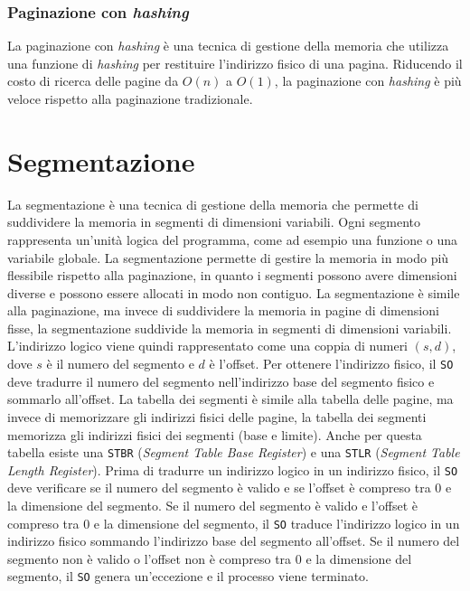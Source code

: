         \subsubsection{Paginazione con \textit{hashing}}
            La paginazione con \textit{hashing} è una tecnica di gestione della memoria che utilizza una funzione di \textit{hashing} per restituire l'indirizzo fisico di una pagina. Riducendo il costo di ricerca delle pagine da $O(n)$ a $O(1)$, la paginazione con \textit{hashing} è più veloce rispetto alla paginazione tradizionale. 
\section{Segmentazione}
    La segmentazione è una tecnica di gestione della memoria che permette di suddividere la memoria in segmenti di dimensioni variabili. Ogni segmento rappresenta un'unità logica del programma, come ad esempio una funzione o una variabile globale. La segmentazione permette di gestire la memoria in modo più flessibile rispetto alla paginazione, in quanto i segmenti possono avere dimensioni diverse e possono essere allocati in modo non contiguo.\newline
    La segmentazione è simile alla paginazione, ma invece di suddividere la memoria in pagine di dimensioni fisse, la segmentazione suddivide la memoria in segmenti di dimensioni variabili. L'indirizzo logico viene quindi rappresentato come una coppia di numeri $(s,d)$, dove $s$ è il numero del segmento e $d$ è l'offset. Per ottenere l'indirizzo fisico, il \texttt{SO} deve tradurre il numero del segmento nell'indirizzo base del segmento fisico e sommarlo all'offset. La tabella dei segmenti è simile alla tabella delle pagine, ma invece di memorizzare gli indirizzi fisici delle pagine, la tabella dei segmenti memorizza gli indirizzi fisici dei segmenti (base e limite). Anche per questa tabella esiste una \texttt{STBR} (\textit{Segment Table Base Register}) e una \texttt{STLR} (\textit{Segment Table Length Register}).\newline
    Prima di tradurre un indirizzo logico in un indirizzo fisico, il \texttt{SO} deve verificare se il numero del segmento è valido e se l'offset è compreso tra $0$ e la dimensione del segmento. Se il numero del segmento è valido e l'offset è compreso tra $0$ e la dimensione del segmento, il \texttt{SO} traduce l'indirizzo logico in un indirizzo fisico sommando l'indirizzo base del segmento all'offset. Se il numero del segmento non è valido o l'offset non è compreso tra $0$ e la dimensione del segmento, il \texttt{SO} genera un'eccezione e il processo viene terminato.
